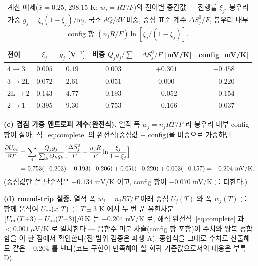 \begin{table}[htbp]
\centering\small
\renewcommand{\arraystretch}{1.2}
\caption{계산 예제($\bar x{=}0.25$, $298.15$ K; $w_j{=}RT/F$)의 전이별 중간값 --- 진행률 $\xi_j$, 봉우리 가중
$g_j=\xi_j(1-\xi_j)/w_j$, 국소 $dQ/dV$ 비중, 중심 표준 계수 $\Delta S^0_j/F$, 봉우리 내부 config 항
$(n_jR/F)\ln[\xi_j/(1-\xi_j)]$.}
\label{tab:worked}
\begin{tabular}{lccccc}
\toprule
전이 & $\xi_j$ & $g_j$ [V$^{-1}$] & 비중 $Q_jg_j/\!\sum$ & $\Delta S^0_j/F$ [mV/K] & config [mV/K] \\
\midrule
$4\!\to\!3$   & $0.005$ & $0.19$ & $0.003$ & $+0.301$ & $-0.458$ \\
$3\!\to\!2\mathrm L$ & $0.072$ & $2.61$ & $0.051$ & $0.000$ & $-0.220$ \\
$2\mathrm L\!\to\!2$ & $0.143$ & $4.77$ & $0.193$ & $-0.052$ & $-0.154$ \\
$2\!\to\!1$   & $0.395$ & $9.30$ & $0.753$ & $-0.166$ & $-0.037$ \\
\bottomrule
\end{tabular}
\end{table}

\textbf{(c) 겹침 가중 엔트로피 계수(완전식).} 열적 폭 $w_j{=}n_jRT/F$ 라 봉우리 내부 config 항이 살아,
식~\eqref{eq:complete} 의 완전식(중심값 $+$ config)을 비중으로 가중하면
\begin{equation*}
\begin{aligned}
\frac{\partial U_{\mathrm{oc}}}{\partial T}
&=\sum_j\frac{Q_jg_j}{\sum_kQ_kg_k}\Big[\frac{\Delta S^0_j}{F}+\frac{n_jR}{F}\ln\frac{\xi_j}{1-\xi_j}\Big]\\
&=0.753(-0.203)+0.193(-0.206)+0.051(-0.220)+0.003(-0.157)
=-0.204\ \mathrm{mV/K}.
\end{aligned}
\end{equation*}
(중심값만 쓴 단순식은 $-0.134$ mV/K 이고, config 항이 $-0.070$ mV/K 를 더한다.)

\textbf{(d) round-trip 실증.} 열적 폭 $w_j{=}n_jRT/F$ 아래 중심 $U_j(T)$ 와 폭 $w_j(T)$ 를 함께 움직여
$U_{\mathrm{oc}}(\bar x,T)$ 를 $T\pm3$ K 에서 두 번 푼 유한차분 $[U_{\mathrm{oc}}(T{+}3)-U_{\mathrm{oc}}(T{-}3)]/6\,\mathrm K$ 는 $-0.204$
mV/K 로, 해석 완전식~\eqref{eq:complete} 과 $<\!0.001\ \mu$V/K 로 일치한다 --- 음함수 미분 사슬(config 항
포함)이 수치와 왕복 정합함을 이 한 점에서 확인한다(전 범위 검증은 파생 A). 종합식을 그대로 수치로 산출해도
같은 $-0.204$ 를 낸다(코드 구현이 만족해야 할 회귀 기준값으로서의 대응은 부록 D).

